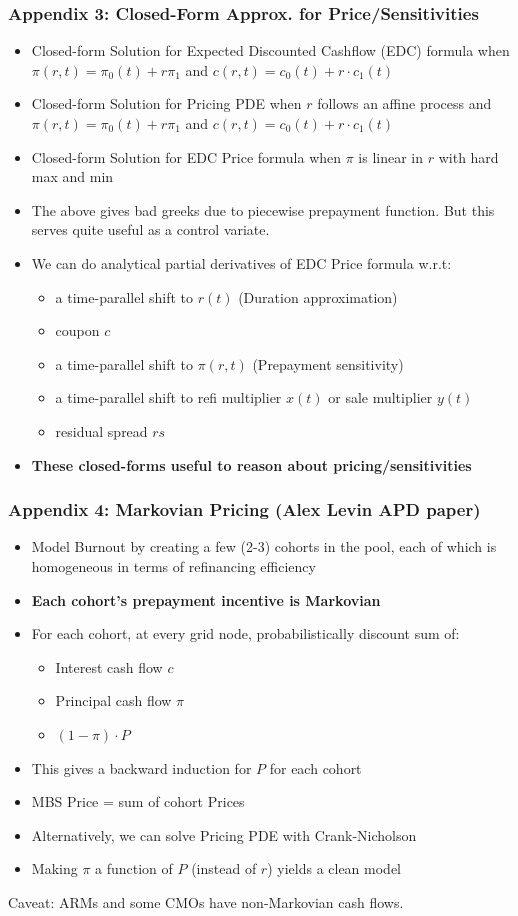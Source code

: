\documentclass{beamer}
\begin{document}
\begin{frame}
\frametitle{Appendix 3: Closed-Form Approx. for Price/Sensitivities}
\begin{itemize}
\item Closed-form Solution for Expected Discounted Cashflow (EDC) formula when $\pi(r,t) = \pi_0(t) + r \pi_1$ and $c(r,t) = c_0(t) + r \cdot c_1(t)$
\item Closed-form Solution for Pricing PDE when $r$ follows an affine process and $\pi(r,t) = \pi_0(t) + r \pi_1$ and $c(r,t) = c_0(t) + r \cdot c_1(t)$
\item Closed-form Solution for EDC Price formula when $\pi$ is linear in $r$ with hard max and min
\item The above gives bad greeks due to piecewise prepayment function. But this serves quite useful as a control variate.
\item We can do analytical partial derivatives of EDC Price formula w.r.t:
\begin{itemize}
\item a time-parallel shift to $r(t)$ (Duration approximation)
\item coupon $c$
\item a time-parallel shift to $\pi(r,t)$ (Prepayment sensitivity)
\item a time-parallel shift to refi multiplier $x(t)$ or sale multiplier $y(t)$
\item residual spread $rs$
\end{itemize}
\item {\bf These closed-forms useful to reason about pricing/sensitivities}
\end{itemize}
\end{frame}


\begin{frame}
\frametitle{Appendix 4: Markovian Pricing (Alex Levin APD paper)}
\begin{itemize}
\item Model Burnout by creating a few (2-3) cohorts in the pool, each of which is homogeneous in terms of refinancing efficiency
\item {\bf Each cohort's prepayment incentive is Markovian}
\item For each cohort, at every grid node, probabilistically discount sum of:
\begin{itemize}
\item Interest cash flow $c$
\item Principal cash flow $\pi$
\item $(1 - \pi) \cdot P$
\end{itemize}
\item This gives a backward induction for $P$ for each cohort
\item MBS Price = sum of cohort Prices
\item Alternatively, we can solve Pricing PDE with Crank-Nicholson
\item Making $\pi$ a function of $P$ (instead of $r$) yields a clean model
\end{itemize}
Caveat: ARMs and some CMOs have non-Markovian cash flows.
\end{frame}
\end{document}
